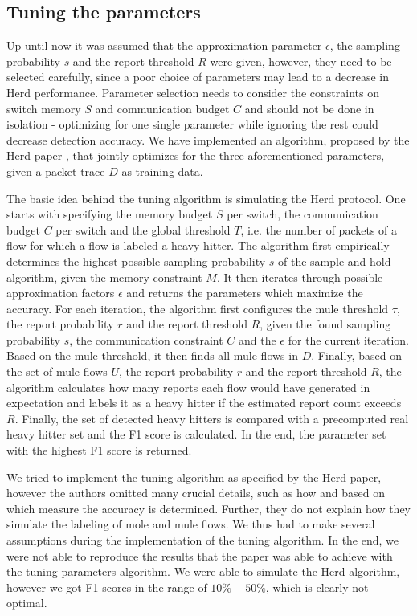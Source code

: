 \documentclass[11pt,oneside,a4paper]{article}
\begin{document}
\subsection{Tuning the parameters} \label{tuningparameters}


Up until now it was assumed that the approximation parameter $\epsilon$, the sampling probability $s$ and the report threshold $R$ were given, however, they need to be selected carefully, since a poor choice of parameters may lead to a decrease in Herd performance. Parameter selection needs to consider the constraints on switch memory $S$ and communication budget $C$ and should not be done in isolation - optimizing for one single parameter while ignoring the rest could decrease detection accuracy. We have implemented an algorithm, proposed by the Herd paper \cite{anon2019herd}, that jointly optimizes for the three aforementioned parameters, given a packet trace $D$ as training data.

The basic idea behind the tuning algorithm is simulating the Herd protocol. One starts with specifying the memory budget $S$ per switch, the communication budget $C$ per switch and the global threshold $T$, i.e. the number of packets of a flow for which a flow is labeled a heavy hitter. The algorithm first empirically determines the highest possible sampling probability $s$ of the sample-and-hold algorithm, given the memory constraint $M$. It then iterates through possible approximation factors $\epsilon$ and returns the parameters which maximize the accuracy. For each iteration, the algorithm first configures the mule threshold $\tau$, the report probability $r$ and the report threshold $R$, given the found sampling probability $s$, the communication constraint $C$ and the $\epsilon$ for the current iteration. Based on the mule threshold, it then finds all mule flows in $D$. Finally, based on the set of mule flows $U$, the report probability $r$ and the report threshold $R$, the algorithm calculates how many reports each flow would have generated in expectation and labels it as a heavy hitter if the estimated report count exceeds $R$. Finally, the set of detected heavy hitters is compared with a precomputed real heavy hitter set and the F1 score is calculated. In the end, the parameter set with the highest F1 score is returned.

We tried to implement the tuning algorithm as specified by the Herd paper, however the authors omitted many crucial details, such as how and based on which measure the accuracy is determined. Further, they do not explain how they simulate the labeling of mole and mule flows. We thus had to make several assumptions during the implementation of the tuning algorithm. In the end, we were not able to reproduce the results that the paper was able to achieve with the tuning parameters algorithm. We were able to simulate the Herd algorithm, however we got F1 scores in the range of $10\% - 50\%$, which is clearly not optimal.
\end{document}
